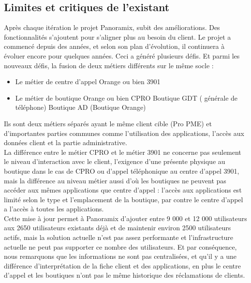 \subsection[Limites et critiques de l’existant]{Limites et critiques de l’existant}
Après chaque itération le projet Panoramix, subit des améliorations. Des fonctionnalités s’ajoutent pour s’aligner plus au besoin du client. Le projet a commencé depuis des années, et selon son plan d’évolution, il continuera à évoluer encore pour quelques années. Ceci a généré plusieurs défis. Et parmi les nouveaux défis, la fusion de deux métiers différents sur le  même socle :
\begin{itemize}
	\item Le métier de centre d’appel Orange ou bien 3901
	\item Le métier de boutique Orange ou bien CPRO
		\subitem \textbullet Boutique GDT ( générale de téléphone)
		\subitem \textbullet Boutique AD (Boutique Orange)
\end{itemize}
Ils sont deux métiers séparés ayant le même client cible (Pro PME) et d'importantes parties communes comme l'utilisation des applications, l'accès aux données client et la partie administrative.\\
La différence entre le métier CPRO et le métier 3901 ne concerne pas seulement le niveau d’interaction avec le client, l'exigence d'une présente physique au boutique dans le cas de CPRO ou d'appel téléphonique au centre d'appel 3901, mais la différence au niveau métier aussi d'où les boutiques ne peuvent pas accéder aux mêmes applications que centre d’appel : l’accès aux applications est limité selon le type et l’emplacement de la boutique, par contre le centre d’appel a l’accès à toutes les applications.\\
Cette mise à jour permet à Panoramix d’ajouter entre 9 000 et 12 000 utilisateurs aux 2650 utilisateurs existants déjà et  de maintenir environ 2500 utilisateurs actifs, mais la solution actuelle n’est pas assez performante et l’infrastructure actuelle ne peut pas supporter ce nombre des utilisateurs. Et par conséquence, nous remarquons que les informations ne sont pas centralisées, et qu'il y a une différence d’interprétation de la fiche client et des applications, en plus le centre d’appel et les boutiques n’ont pas le même historique des réclamations de clients.
